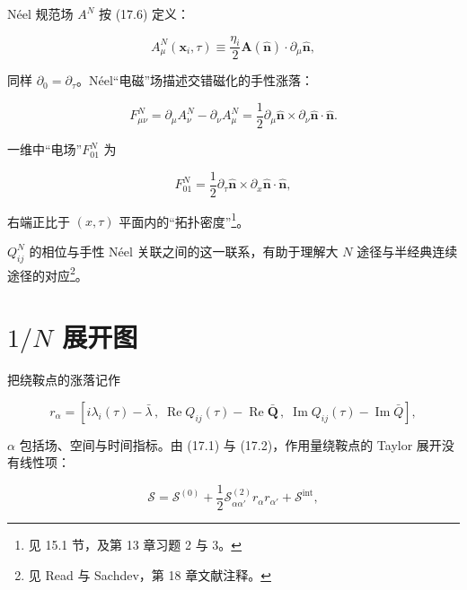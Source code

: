 Néel 规范场 $A^{N}$ 按 (17.6) 定义：

\begin{equation*}
A _ {\mu} ^ {N} ( \mathbf {x} _ {i}, \tau ) \equiv \frac {\eta_ {i}}{2} \mathbf {A} ( \hat {\mathbf {n}} ) \cdot \partial_ {\mu} \hat {\mathbf {n}} ,
\tag{17.11}
\end{equation*}

同样 $\partial_{0} = \partial_{\tau}$。Néel“电磁”场描述交错磁化的手性涨落：

\begin{equation*}
F _ {\mu \nu} ^ {N} = \partial_ {\mu} A _ {\nu} ^ {N} - \partial_ {\nu} A _ {\mu} ^ {N} = \frac {1}{2} \partial_ {\mu} \hat {\mathbf {n}} \times \partial_ {\nu} \hat {\mathbf {n}} \cdot \hat {\mathbf {n}}.
\tag{17.12}
\end{equation*}

一维中“电场”$F_{01}^{N}$ 为

\begin{equation*}
F _ {01} ^ {N} = \frac {1}{2} \partial_ {\tau} \hat {\mathbf {n}} \times \partial_ {x} \hat {\mathbf {n}} \cdot \hat {\mathbf {n}} ,
\tag{17.13}
\end{equation*}

右端正比于 $(x,\tau)$ 平面内的“拓扑密度”\footnote{见 15.1 节，及第 13 章习题 2 与 3。}。

$Q_{ij}^{N}$ 的相位与手性 Néel 关联之间的这一联系，有助于理解大 $N$ 途径与半经典连续途径的对应\footnote{见 Read 与 Sachdev，第 18 章文献注释。}。

\section{$1/N$ 展开图}

把绕鞍点的涨落记作

\begin{equation*}
r _ {\alpha} = \left[ i \lambda_ {i} ( \tau ) - \bar {\lambda} \, , \; \operatorname{Re} Q _ {ij} ( \tau ) - \operatorname{Re} \bar {\mathbf {Q}} \, , \; \operatorname{Im} Q _ {ij} ( \tau ) - \operatorname{Im} \bar {Q} \right] ,
\tag{17.14}
\end{equation*}

$\alpha$ 包括场、空间与时间指标。由 (17.1) 与 (17.2)，作用量绕鞍点的 Taylor 展开没有线性项：

\begin{equation*}
\mathcal {S} = \mathcal {S} ^ {(0)} + \frac {1}{2} \mathcal {S}_{\alpha \alpha '} ^ {(2)} r_ {\alpha} r_{\alpha '} + \mathcal {S} ^ {\mathrm{int}} ,
\tag{17.15}
\end{equation*}

